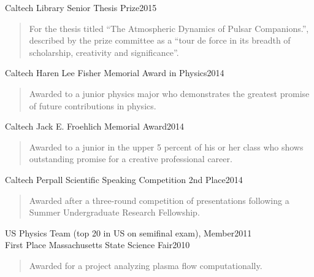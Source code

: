 \documentclass[line, margin]{res3address}
\begin{document}
\begin{resume}
\vspace{-1em}
Caltech Library Senior Thesis Prize\hfill 2015\\
\vspace{-1em}
\begin{quote}
For the thesis titled “The Atmospheric Dynamics of Pulsar Companions.”, described by the prize committee as a “tour de force in its breadth of scholarship, creativity and significance”.\\	
\end{quote}
\vspace{-1em}
\vspace{-1em}
Caltech Haren Lee Fisher Memorial Award in Physics\hfill 2014\\
\vspace{-1em}
\begin{quote}
Awarded to a junior physics major who demonstrates the greatest promise of future contributions in physics.
\end{quote}
\vspace{-1em}
Caltech Jack E. Froehlich Memorial Award\hfill 2014\\
\vspace{-1em}
\begin{quote}
Awarded to a junior in the upper 5 percent of his or her class who shows outstanding promise for a creative professional career.
\end{quote}
\vspace{-1em}
Caltech Perpall Scientific Speaking Competition 2nd Place\hfill 2014\\
\vspace{-1em}
\begin{quote}
Awarded after a three-round competition of presentations following a Summer Undergraduate Research Fellowship.	
\end{quote}
\vspace{-1em}
US Physics Team (top 20 in US on semifinal exam), Member\hfill 2011\\
First Place Massachusetts State Science Fair\hfill 2010\\
\vspace{-1em}
\begin{quote}
Awarded for a project analyzing plasma flow computationally.
\end{quote}
\vspace{-1em}


\end{resume}
\end{document}
